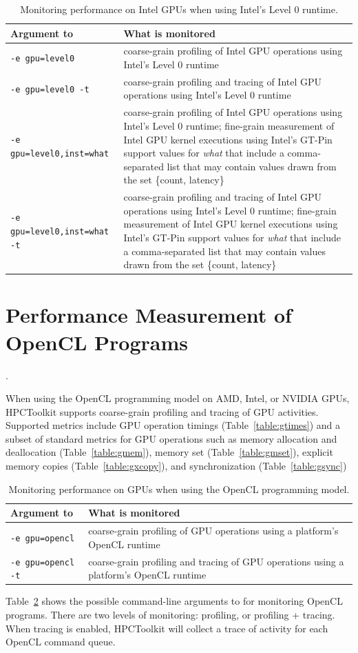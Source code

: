 \begin{table}[t]
\centering
\begin{tabular}{|l|p{3.5in}|}\hline
Argument to \hpcrun{} & What is monitored\\\hline\hline
{\tt -e gpu=level0} & coarse-grain profiling of Intel GPU operations using Intel's Level 0 runtime\\\hline
{\tt -e gpu=level0 -t} & coarse-grain profiling and tracing of Intel GPU operations using Intel's Level 0 runtime\\\hline
{\tt -e gpu=level0,inst=what} & coarse-grain profiling of Intel GPU operations using Intel's Level 0 runtime;  fine-grain measurement of Intel GPU kernel executions using Intel's GT-Pin support values for {\em what} that include a comma-separated list that may contain values drawn from the set \{count, latency\}\\\hline
{\tt -e gpu=level0,inst=what -t } & coarse-grain profiling and tracing of Intel GPU operations using Intel's Level 0 runtime;  fine-grain measurement of Intel GPU kernel executions using Intel's GT-Pin support values for {\em what} that include a comma-separated list that may contain values drawn from the set \{count, latency\}\\\hline
\end{tabular}
\caption{Monitoring performance on Intel GPUs when using Intel's Level 0 runtime.}
\label{intel-level0-options}
\end{table}

\section{Performance Measurement of OpenCL Programs}
\label{sec:gpu-opencl}.


When using the OpenCL programming model on AMD, Intel, or NVIDIA GPUs, HPCToolkit supports coarse-grain profiling and tracing of GPU activities.
Supported metrics include GPU operation timings (Table~\ref{table:gtimes}) and a subset of standard metrics for GPU operations such as memory allocation and deallocation (Table~\ref{table:gmem}), memory set (Table~\ref{table:gmset}), explicit memory copies (Table~\ref{table:gxcopy}), and synchronization (Table~\ref{table:gsync})

\begin{table}[h]
\centering
\begin{tabular}{|l|p{3.5in}|}\hline
Argument to \hpcrun{} & What is monitored\\\hline\hline
{\tt -e gpu=opencl} & coarse-grain profiling of  GPU operations using a platform's OpenCL runtime\\\hline
{\tt -e gpu=opencl -t} & coarse-grain profiling and tracing of  GPU operations using a platform's OpenCL runtime\\\hline
\end{tabular}
\caption{Monitoring performance on GPUs when using the OpenCL programming model.}
\label{opencl-monitoring-options}
\end{table}


Table~\ref{opencl-monitoring-options} shows the possible command-line arguments to \hpcrun{} for monitoring  OpenCL programs. There are two levels of monitoring: profiling, or profiling + tracing. When tracing is enabled,  HPCToolkit will collect a trace of activity for each OpenCL command queue.
